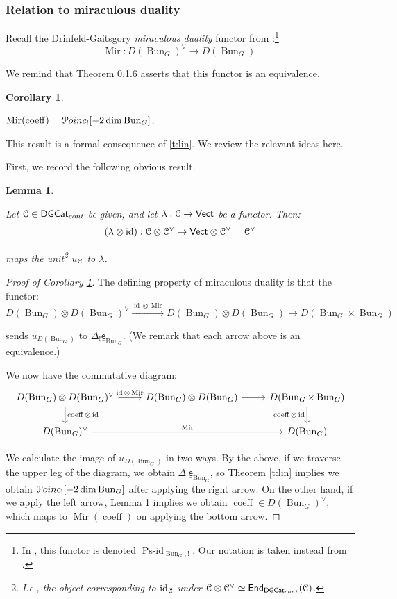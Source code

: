 \documentclass[reqno,11pt]{amsart}
\numberwithin{equation}{subsection}
\newtheorem{cor}[thm]{Corollary}
\newtheorem{lem}[thm]{Lemma}
\theoremstyle{remark}
\newcommand{\xar}[1]{\xrightarrow{#1}}
\newcommand{\sC}{{\EuScript C}}
\newcommand{\sP}{{\EuScript P}}
\newcommand{\on}{\operatorname}
\newcommand{\ul}{\underline}
\newcommand{\id}{\on{id}}
\newcommand{\Vect}{\mathsf{Vect}}
\newcommand{\Bun}{\on{Bun}}
\newcommand{\DGCat}{\mathsf{DGCat}}
\newcommand{\TwoEnd}{\mathsf{End}}
\newcommand{\coeff}{\on{coeff}}
\newcommand{\Poinc}{\sP oinc}
\newcommand{\sfe}{\mathsf{e}}
\newcommand{\Mir}{\on{Mir}}
\begin{document}
\subsubsection{Relation to miraculous duality}

Recall the Drinfeld-Gaitsgory \emph{miraculous duality} functor
from \cite{strange}:\footnote{In \cite{strange}, this
functor is denoted $\on{Ps-id}_{\Bun_G,!}$. Our notation is
taken instead from \cite{agkrrv2}.}
%
\[
\Mir:D(\Bun_G)^{\vee} \to D(\Bun_G).
\]

\noindent We remind that \cite{strange} Theorem 0.1.6 asserts that
this functor is an equivalence.

\begin{cor}\label{c:lin-mir}

$\Mir(\coeff) = \Poinc_![-2\dim \Bun_G]$.

\end{cor}

This result is a formal consequence of \ref{t:lin}. 
We review the relevant ideas here.

First, we record the following obvious result.

\begin{lem}\label{l:lambda}

Let $\sC \in \DGCat_{cont}$ be given, and let $\lambda:\sC \to \Vect$
be a functor. Then:
%
\[
(\lambda \otimes \id):\sC \otimes \sC^{\vee} \to \Vect \otimes \sC^{\vee} = \sC^{\vee}
\]

\noindent maps the unit\footnote{I.e., the object
corresponding to $\id_{\sC}$ under $\sC \otimes \sC^{\vee} \simeq 
\TwoEnd_{\DGCat_{cont}}(\sC)$.} $u_{\sC}$  to $\lambda$.

\end{lem}

\begin{proof}[Proof of Corollary \ref{c:lin-mir}]

The defining property of miraculous duality is that the functor:
%
\[
D(\Bun_G) \otimes D(\Bun_G)^{\vee} \xar{\id \otimes \Mir} 
D(\Bun_G) \otimes D(\Bun_G) \to D(\Bun_G \times \Bun_G)
\]

\noindent sends $u_{D(\Bun_G)}$ to $\Delta_!\ul{\sfe}_{\Bun_G}$.
(We remark that each arrow above is an equivalence.)

We now have the commutative diagram:
%
\[
\begin{tikzcd}
D(\Bun_G) \otimes D(\Bun_G)^{\vee} 
\arrow[r,"\id \otimes \Mir"]
\arrow[d,"\coeff \otimes \id"]
&
D(\Bun_G) \otimes D(\Bun_G) 
\arrow[r]
&
D(\Bun_G \times \Bun_G)
\arrow[d,"\coeff \otimes \id",swap]
\\
D(\Bun_G)^{\vee}
\arrow[rr,"\Mir"]
&&
D(\Bun_G)
\end{tikzcd}
\]

We calculate the image of $u_{D(\Bun_G)}$ in two ways. By the above,
if we traverse the upper leg of the diagram, we obtain
$\Delta_!\ul{\sfe}_{\Bun_G}$, so Theorem \ref{t:lin} implies 
we obtain $\Poinc_![-2\dim \Bun_G]$ after applying the right arrow.
On the other hand, if we apply the left arrow, Lemma \ref{l:lambda}
implies we obtain $\coeff \in D(\Bun_G)^{\vee}$, which maps to 
$\Mir(\coeff)$ on applying the bottom arrow.

\end{proof}
\end{document}
